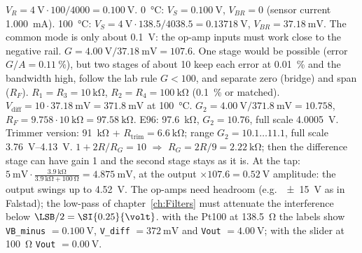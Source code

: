 \begin{solution}
\begin{talist}
\ta $V_R = \SI{4}{\volt}\cdot 100/4000 = \SI{0.100}{\volt}$. \SI{0}{\celsius}: $V_S = \SI{0.100}{\volt}$, $V_{BR} = 0$
    (sensor current \SI{1.000}{\milli\ampere}).
    \SI{100}{\celsius}: $V_S = \SI{4}{\volt}\cdot 138.5/4038.5 = \SI{0.13718}{\volt}$, $V_{BR} = \SI{37.18}{\milli\volt}$.
    The common mode is only about \SI{0.1}{\volt}: the op-amp inputs must work close to the negative rail.
\ta $G = \SI{4.00}{\volt}/\SI{37.18}{\milli\volt} = 107.6$. One stage would be possible (error $G/A = \SI{0.11}{\percent}$),
    but two stages of about 10 keep each error at \SI{0.01}{\percent} and the bandwidth high, follow the lab rule $G<100$,
    and separate zero (bridge) and span ($R_F$).
\ta $R_1 = R_3 = \SI{10}{\kilo\ohm}$, $R_2 = R_4 = \SI{100}{\kilo\ohm}$ (\SI{0.1}{\percent} or matched).
    $V_\mathrm{diff} = 10\cdot\SI{37.18}{\milli\volt} = \SI{371.8}{\milli\volt}$ at \SI{100}{\celsius}.
\os{\newpage}
\ta $G_2 = \SI{4.00}{\volt}/\SI{371.8}{\milli\volt} = 10.758$, $R_F = 9.758\cdot\SI{10}{\kilo\ohm} = \SI{97.58}{\kilo\ohm}$.
    E96: \SI{97.6}{\kilo\ohm}, $G_2 = 10.76$, full scale \SI{4.0005}{\volt}.
    Trimmer version: \SI{91}{\kilo\ohm} + $R_\mathrm{trim} = \SI{6.6}{\kilo\ohm}$; range $G_2 = 10.1\ldots 11.1$,
    full scale \SIrange{3.76}{4.13}{\volt}.
\ta $1+2R/R_G = 10$ $\Rightarrow$ $R_G = 2R/9 = \SI{2.22}{\kilo\ohm}$; then the difference stage can have gain 1 and the
    second stage stays as it is.
\ta At the tap: $\SI{5}{\milli\volt}\cdot\frac{\SI{3.9}{\kilo\ohm}}{\SI{3.9}{\kilo\ohm}+\SI{100}{\ohm}} = \SI{4.875}{\milli\volt}$,
    at the output $\times 107.6 = \SI{0.52}{\volt}$ amplitude: the output swings up to \SI{4.52}{\volt}.
    The op-amps need headroom (e.g.\ \SI{\pm 15}{\volt} as in Falstad); the low-pass of
    chapter~\ref{ch:Filters} must attenuate the interference below $\LSB/2 = \SI{0.25}{\volt}$.
\ta {}\newline with the Pt100 at \SI{138.5}{\ohm} the labels show \texttt{VB\_minus} $= \SI{0.100}{\volt}$,
    \texttt{V\_diff} $= \SI{372}{\milli\volt}$ and \texttt{Vout} $= \SI{4.00}{\volt}$; with the slider at \SI{100}{\ohm} \texttt{Vout} $= \SI{0.00}{\volt}$.
\end{talist}
\end{solution}

